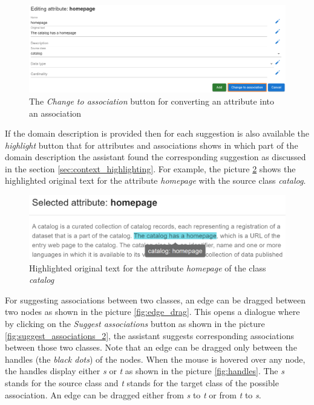 \begin{figure}[!h]
    \includegraphics[scale=0.3]{../docs/images/frontend/change-to-association.png}
    \caption{\centering The \textit{Change to association} button for converting an attribute into an association}
    \label{fig:change_to_association}
\end{figure}

If the domain description is provided then for each suggestion is also available the \textit{highlight} button that for attributes and associations shows in which part of the domain description the assistant found the corresponding suggestion as discussed in the section \ref{sec:context_highlighting}. For example, the picture \ref{fig:highlight_original_text} shows the highlighted original text for the attribute \textit{homepage} with the source class \textit{catalog}.

\begin{figure}[!h]
    \includegraphics[scale=0.31]{../docs/images/frontend/highlight-original-text.png}
    \caption{\centering Highlighted original text for the attribute \textit{homepage} of the class \textit{catalog}}
    \label{fig:highlight_original_text}
\end{figure}

For suggesting associations between two classes, an edge can be dragged between two nodes as shown in the picture \ref{fig:edge_drag}. This opens a dialogue where by clicking on the \textit{Suggest associations} button as shown in the picture \ref{fig:suggest_associations_2}, the assistant suggests corresponding associations between those two classes. Note that an edge can be dragged only between the handles (the \textit{black dots}) of the nodes. When the mouse is hovered over any node, the handles display either \textit{s} or \textit{t} as shown in the picture \ref{fig:handles}. The \textit{s} stands for the source class and \textit{t} stands for the target class of the possible association. An edge can be dragged either from \textit{s} to \textit{t} or from \textit{t} to \textit{s}.

